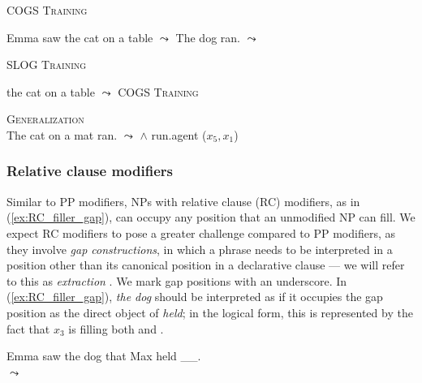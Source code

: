 \begin{exe}
    \ex \label{ex:train_PP_COGS} \textsc{COGS Training} 
    \begin{xlist}
    \ex \label{ex:train_PP_dobj} Emma saw the cat on a table $\leadsto$ 
    \ex The dog ran. $\leadsto$ 
    \end{xlist}
\ex \label{ex:train_PP_SLOG}\textsc{SLOG Training} 
\begin{xlist}
  \ex \label{ex:standalone_PP} the cat on a table $\leadsto$ 
  \ex \textsc{COGS Training} 
\end{xlist} 
\ex \label{ex:PP_subj} \textsc{Generalization}
 \\
 The cat on a mat ran. $\leadsto$  $\land$ run.agent ($x_5,x_1$)

\end{exe}

\subsubsection{Relative clause modifiers} \label{subsubsec:rc-mod}

Similar to PP modifiers, NPs with relative clause (RC) modifiers, as in (\ref{ex:RC_filler_gap}), can occupy any position that an unmodified NP can fill. We expect RC modifiers to pose a greater challenge compared to PP modifiers, as they involve \textit{gap constructions}, in which a phrase needs to be interpreted in a position other than its canonical position in a declarative clause --- we will refer to this as \textit{extraction} \citep{sag2010english}. We mark gap positions with an underscore. In (\ref{ex:RC_filler_gap}), \textit{the dog} should be interpreted as if it occupies the gap position as the direct object of \textit{held}; in the logical form, this is represented by the fact that $x_3$ is filling both  and .
\vspace{-0.5\baselineskip}
\begin{exe}
     \ex \label{ex:RC_filler_gap} Emma saw the dog that Max held \_\_.  \vspace{0.1cm} \\
         $\leadsto$
\end{exe}



